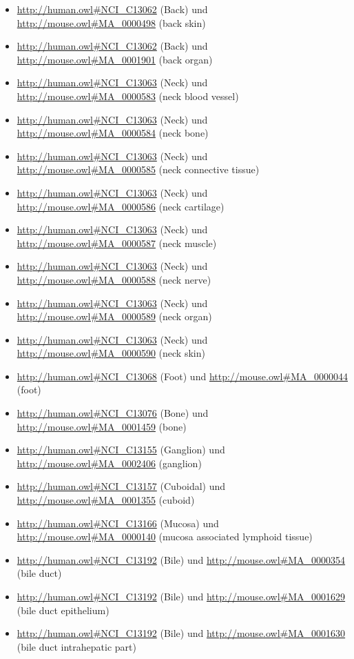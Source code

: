 \begin{itemize}
	\item \url{http://human.owl#NCI_C13062} (Back) und \url{http://mouse.owl#MA_0000498} (back skin)
	\item \url{http://human.owl#NCI_C13062} (Back) und \url{http://mouse.owl#MA_0001901} (back organ)
	\item \url{http://human.owl#NCI_C13063} (Neck) und \url{http://mouse.owl#MA_0000583} (neck blood vessel)
	\item \url{http://human.owl#NCI_C13063} (Neck) und \url{http://mouse.owl#MA_0000584} (neck bone)
	\item \url{http://human.owl#NCI_C13063} (Neck) und \url{http://mouse.owl#MA_0000585} (neck connective tissue)
	\item \url{http://human.owl#NCI_C13063} (Neck) und \url{http://mouse.owl#MA_0000586} (neck cartilage)
	\item \url{http://human.owl#NCI_C13063} (Neck) und \url{http://mouse.owl#MA_0000587} (neck muscle)
	\item \url{http://human.owl#NCI_C13063} (Neck) und \url{http://mouse.owl#MA_0000588} (neck nerve)
	\item \url{http://human.owl#NCI_C13063} (Neck) und \url{http://mouse.owl#MA_0000589} (neck organ)
	\item \url{http://human.owl#NCI_C13063} (Neck) und \url{http://mouse.owl#MA_0000590} (neck skin)
	\item \url{http://human.owl#NCI_C13068} (Foot\textunderscoreBone) und \url{http://mouse.owl#MA_0000044} (foot)
	\item \url{http://human.owl#NCI_C13076} (Bone\textunderscoreTissue) und \url{http://mouse.owl#MA_0001459} (bone)
	\item \url{http://human.owl#NCI_C13155} (Ganglion\textunderscoreCell) und \url{http://mouse.owl#MA_0002406} (ganglion)
	\item \url{http://human.owl#NCI_C13157} (Cuboidal\textunderscoreCell) und \url{http://mouse.owl#MA_0001355} (cuboid)
	\item \url{http://human.owl#NCI_C13166} (Mucosa) und \url{http://mouse.owl#MA_0000140} (mucosa associated lymphoid tissue)
	\item \url{http://human.owl#NCI_C13192} (Bile) und \url{http://mouse.owl#MA_0000354} (bile duct)
	\item \url{http://human.owl#NCI_C13192} (Bile) und \url{http://mouse.owl#MA_0001629} (bile duct epithelium)
	\item \url{http://human.owl#NCI_C13192} (Bile) und \url{http://mouse.owl#MA_0001630} (bile duct intrahepatic part)

\end{itemize}
